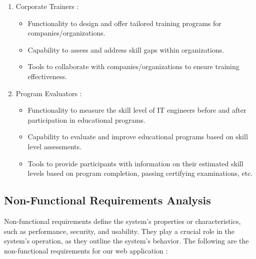 \begin{enumerate}
\begin{enumerate}
                    \newpage
              \item Corporate Trainers : \\
                    \begin{itemize}
                        \renewcommand\labelitemi{-}
                        \item Functionality to design and offer tailored training programs for companies/organizations.
                        \item Capability to assess and address skill gaps within organizations.
                        \item Tools to collaborate with companies/organizations to ensure training effectiveness.
                    \end{itemize}
              \item Program Evaluators : \\
                    \begin{itemize}
                        \renewcommand\labelitemi{-}
                        \item Functionality to measure the skill level of IT engineers before and after participation in educational programs.
                        \item Capability to evaluate and improve educational programs based on skill level assessments.
                        \item Tools to provide participants with information on their estimated skill levels based on program completion, passing certifying examinations, etc.
                    \end{itemize}
          \end{enumerate}
          
\end{enumerate}

\subsection{Non-Functional Requirements Analysis}
Non-functional requirements define the system's properties or characteristics, such as performance, security, and usability. They play a crucial role in the system's operation, as they outline the system's behavior. The following are the non-functional requirements for our web application :

